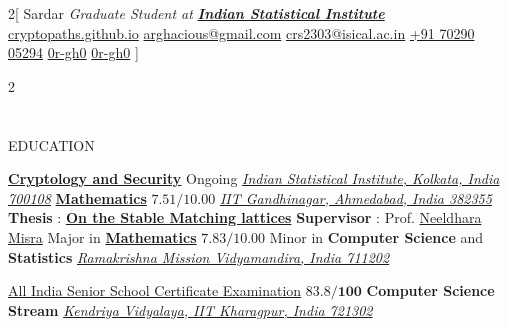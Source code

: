 \documentclass{my_cv}
\begin{document}
\begin{multicols}{2}[
        {Sardar}%
        {\textit{Graduate Student at} \textbf{\href{https://www.isical.ac.in/}{\textit{Indian Statistical Institute}}}}%
        {\href{https://cryptopaths.github.io/}{cryptopaths.github.io}}%
        {\href{mailto:arghacious@gmail.com}{arghacious@gmail.com}}%
        {\href{mailto:crs2303@isical.ac.in}{crs2303@isical.ac.in}}%
        {\href{https://api.whatsapp.com/send?phone=917029005294}{+91 70290 05294}}%
        {\href{https://in.linkedin.com/in/0r-gh0}{0r-gh0}}
        {\href{https://github.com/0r-gh0}{0r-gh0}}
]
\end{multicols}


\begin{multicols}{2}

\section{\faGraduationCap}{EDUCATION}

{\textbf{\href{https://www.isical.ac.in/~rcbose/mtechCrS.pdf}{Cryptology and Security}} \hfill Ongoing}
{\textit{\href{https://www.isical.ac.in/}{Indian Statistical Institute, Kolkata, India 700108}}}{}{}
\vspace{-15pt}
{\textbf{\href{https://math.iitgn.ac.in/}{Mathematics}} \hfill $\mathbf{7.51/10.00}$}
{\textit{\href{https://www.iitgn.ac.in/}{IIT Gandhinagar, Ahmedabad, India 382355}}} %
{\textbf{Thesis} : \href{https://github.com/0r-gh0/Msc-Thesis}{\textbf{On the Stable Matching lattices}} \newline \textbf{Supervisor} : Prof. \href{https://www.neeldhara.com/}{Neeldhara Misra}}
{Major in \textbf{\href{https://vidyamandira.ac.in/department/mathematics/}{Mathematics}}  \hfill $\mathbf{7.83/10.00}$} 
{Minor in \textbf{Computer Science} and \textbf{Statistics}}
{\textit{\href{https://vidyamandira.ac.in/}{Ramakrishna Mission Vidyamandira, India 711202}}} %

{\href{https://en.wikipedia.org/wiki/All_India_Senior_School_Certificate_Examination}{All India Senior School Certificate Examination}   \hfill $\mathbf{83.8/100}$} 
{\textbf{Computer Science Stream}}
{\textit{\href{https://iitkharagpur.kvs.ac.in/}{Kendriya Vidyalaya, IIT Kharagpur, India 721302}}}


\end{multicols}
\end{document}
